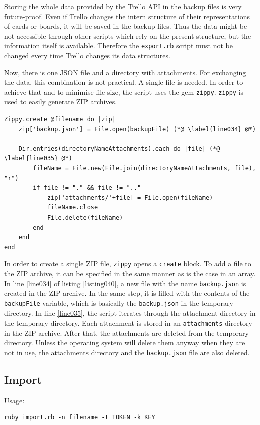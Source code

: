 Storing the whole data provided by the Trello API in the backup files is very future-proof. Even if Trello changes the intern structure of their representations of cards or boards, it will be saved in the backup files. Thus the data might be not accessible through other scripts which rely on the present structure, but the information itself is available. Therefore the \texttt{export.rb} script must not be changed every time Trello changes its data structures.

Now, there is one JSON file and a directory with attachments. For exchanging the data, this combination is not practical. A single file is needed. In order to achieve that and to minimise file size, the script uses the gem \texttt{zippy}. \texttt{zippy} is used to easily generate ZIP archives. 

\begin{lstlisting}[aboveskip=1\baselineskip, caption=Creating a ZIP archive out of the backed up data., label=listing040]
Zippy.create @filename do |zip|
	zip['backup.json'] = File.open(backupFile) (*@ \label{line034} @*)

	Dir.entries(directoryNameAttachments).each do |file| (*@ \label{line035} @*)
		fileName = File.new(File.join(directoryNameAttachments, file), "r") 
		if file != "." && file != ".."
			zip['attachments/'+file] = File.open(fileName)
			fileName.close
			File.delete(fileName)
		end
	end
end
\end{lstlisting}

In order to create a single ZIP file, \texttt{zippy} opens a \lstinline{create} block. To add a file to the ZIP archive, it can be specified in the same manner as is the case in an array. In  line \ref{line034} of listing \ref{listing040}, a new file with the name \texttt{backup.json} is created in the ZIP archive. In the same step, it is filled with the contents of the \lstinline{backupFile} variable, which is basically the \texttt{backup.json} in the temporary directory. In line \ref{line035}, the script iterates through the attachment directory in the temporary directory. Each attachment is stored in an \texttt{attachments} directory in the ZIP archive. After that, the attachments are deleted from the temporary directory. Unless the operating system will delete them anyway when they are not in use, the attachments directory and the \texttt{backup.json} file are also deleted. \cite{zippy}




\subsection{Import}
Usage:
\begin{lstlisting}[aboveskip=1\baselineskip, style=bash, caption=\texttt{import.rb} usage., label=listing041]
ruby import.rb -n filename -t TOKEN -k KEY
\end{lstlisting}

